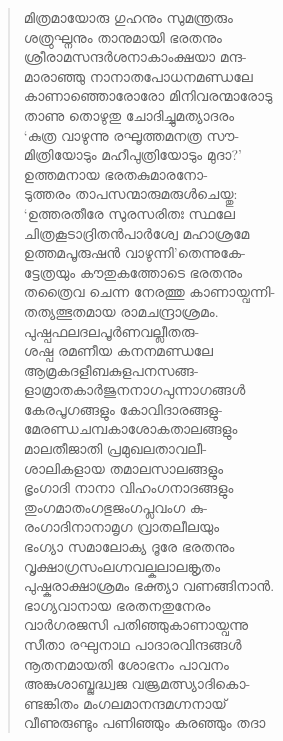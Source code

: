 \begin{verse}
മിത്രമായോരു ഗുഹനും സുമന്ത്രരും\\
ശത്രുഘ്നനും താനുമായി ഭരതനും\\
ശ്രീരാമസന്ദര്‍ശനാകാംക്ഷയാ മന്ദ-\\
മാരാഞ്ഞു നാനാതപോധനമണ്ഡലേ\\
കാണാഞ്ഞൊരോരോ മിനിവരന്മാരോടു\\
താണു തൊഴുതു ചോദിച്ചുമത്യാദരം\\
‘കുത്ര വാഴുന്നു രഘൂത്തമനത്ര സൗ-\\
മിത്രിയോടും മഹീപുത്രിയോടും മുദാ?’\\
ഉത്തമനായ ഭരതകുമാരനോ-\\
ടുത്തരം താപസന്മാരുമരുള്‍ചെയ്തു:\\
‘ഉത്തരതീരേ സുരസരിതഃ സ്ഥലേ\\
ചിത്രകൂടാദ്രിതന്‍പാര്‍ശ്വേ മഹാശ്രമേ\\
ഉത്തമപൂരുഷന്‍ വാഴുന്നി’തെന്നുകേ-\\
ട്ടേത്രയും കൗതുകത്തോടെ ഭരതനും\\
തത്രൈവ ചെന്ന നേരത്തു കാണായ്വന്നി-\\
തത്യത്ഭുതമായ രാമചന്ദ്രാശ്രമം.\\
പുഷ്പഫലദലപൂര്‍ണവല്ലീതരു-\\
ശഷ്പ രമണീയ കനനമണ്ഡലേ\\
ആമ്രകദളീബകുളപനസങ്ങ-\\
ളാമ്രാതകാര്‍ജുനനാഗപുന്നാഗങ്ങള്‍\\
കേരപൂഗങ്ങളും കോവിദാരങ്ങളു-\\
മേരണ്ഡചമ്പകാശോകതാലങ്ങളും\\
മാലതീജാതി പ്രമുഖലതാവലീ-\\
ശാലികളായ തമാലസാലങ്ങളും\\
ഭൃംഗാദി നാനാ വിഹംഗനാദങ്ങളും\\
തുംഗമാതംഗഭുജംഗപ്ലവംഗ കു-\\
രംഗാദിനാനാമൃഗ വ്രാതലീലയും\\
ഭംഗ്യാ സമാലോക്യ ദൂരേ ഭരതനും\\
വൃക്ഷാഗ്രസംലഗ്നവല്കലാലങ്കൃതം\\
പുഷ്കരാക്ഷാശ്രമം ഭക്ത്യാ വണങ്ങിനാന്‍.\\
ഭാഗ്യവാനായ ഭരതനതുനേരം\\
വാര്‍ഗരജസി പതിഞ്ഞുകാണായ്വന്നു\\
സീതാ രഘുനാഥ പാദാരവിന്ദങ്ങള്‍\\
നൂതനമായതി ശോഭനം പാവനം\\
അങ്കുശാബ്ജദ്ധ്വജ വജ്രമത്സ്യാദികൊ-\\
ണ്ടങ്കിതം മംഗലമാനന്ദമഗ്നനായ്\\
വീണുരുണ്ടും പണിഞ്ഞും കരഞ്ഞും തദാ\\

\end{verse}

